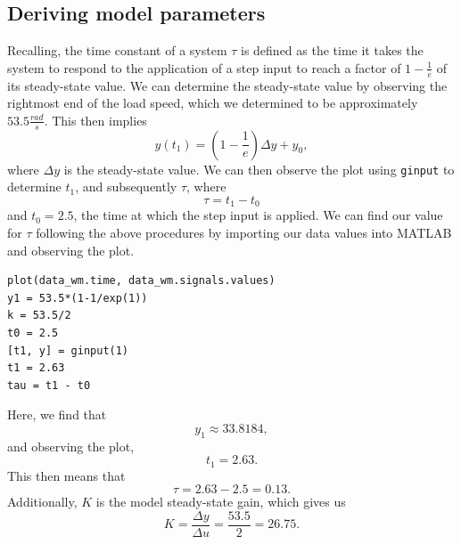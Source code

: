 \documentclass{article}
\begin{document}
\subsection{Deriving model parameters}
Recalling, the time constant of a system $\tau$ is defined as the time it takes the system to respond to the application of a step input to reach a factor of $1-\frac{1}{e}$ of its steady-state value. We can determine the steady-state value by observing the rightmost end of the load speed, which we determined to be approximately $53.5\frac{rad}{s}$. This then implies
\begin{equation}
    y(t_1)=(1-\frac{1}{e})\Delta y+y_0,
\end{equation}
where $\Delta y$ is the steady-state value. We can then observe the plot using \verb|ginput| to determine $t_1$, and subsequently $\tau$, where
\begin{equation}
    \tau=t_1-t_0
\end{equation}
and $t_0=2.5$, the time at which the step input is applied. We can find our value for $\tau$ following the above procedures by importing our data values into MATLAB and observing the plot.
\begin{verbatim}
plot(data_wm.time, data_wm.signals.values)
y1 = 53.5*(1-1/exp(1))
k = 53.5/2
t0 = 2.5
[t1, y] = ginput(1)
t1 = 2.63
tau = t1 - t0
\end{verbatim}
Here, we find that
\begin{equation}
    y_1\approx33.8184,
\end{equation}
and observing the plot,
\begin{equation}
    t_1 = 2.63.
\end{equation}
This then means that
\begin{equation}
    \tau = 2.63-2.5=0.13.
\end{equation}
Additionally, $K$ is the model steady-state gain, which gives us
\begin{equation}
    K=\frac{\Delta y}{\Delta u} = \frac{53.5}{2}=26.75.
\end{equation}
\end{document}
